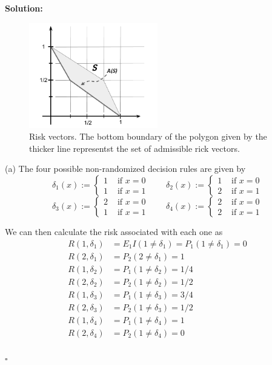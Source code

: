 \documentclass[12pt]{article}
\newcounter{ProofCounter}
\newenvironment{Solution}{\stepcounter{ProofCounter}\textbf{Solution:}}{\hfill$\square$}
\begin{document}
\begin{Solution}
  \begin{figure}[h!]
    \centering
    \includegraphics[width=0.5\textwidth]{./figures/hw04.png}
    \caption{Risk vectors. The bottom boundary of the polygon given by the thicker line representst the set of admissible rick vectors.}
    \label{fig:1}
  \end{figure}


  (a) The four possible non-randomized decision rules are given by 
  \[ 
    \delta_1(x) := \left\{ \begin{array}{cl} 1 & \text{ if } x = 0 \\ 1 & \text{ if } x = 1 \end{array} \right. \qquad 
    \delta_2(x) := \left\{ \begin{array}{cl} 1 & \text{ if } x = 0 \\ 2 & \text{ if } x = 1 \end{array} \right. 
  \]
  \[ 
    \delta_3(x) := \left\{ \begin{array}{cl} 2 & \text{ if } x = 0 \\ 1 & \text{ if } x = 1 \end{array} \right. \qquad 
    \delta_4(x) := \left\{ \begin{array}{cl} 2 & \text{ if } x = 0 \\ 2 & \text{ if } x = 1 \end{array} \right. 
  \]

  We can then calculate the risk associated with each one as 
  \begin{align*}
    R(1, \delta_1) & = E_{1}I(1 \neq \delta_1) = P_{1}(1 \neq \delta_1) = 0 \\
    R(2, \delta_1) & = P_{2}(2 \neq \delta_1) = 1 \\
    R(1, \delta_2) & = P_{1}(1 \neq \delta_2) = 1/4 \\
    R(2, \delta_2) & = P_{2}(1 \neq \delta_2) = 1/2 \\
    R(1, \delta_3) & = P_{1}(1 \neq \delta_3) = 3/4 \\
    R(2, \delta_3) & = P_{2}(1 \neq \delta_3) = 1/2 \\
    R(1, \delta_4) & = P_{1}(1 \neq \delta_4) = 1 \\
    R(2, \delta_4) & = P_{2}(1 \neq \delta_4) = 0 \\
  \end{align*}


\end{Solution}
\end{document}
